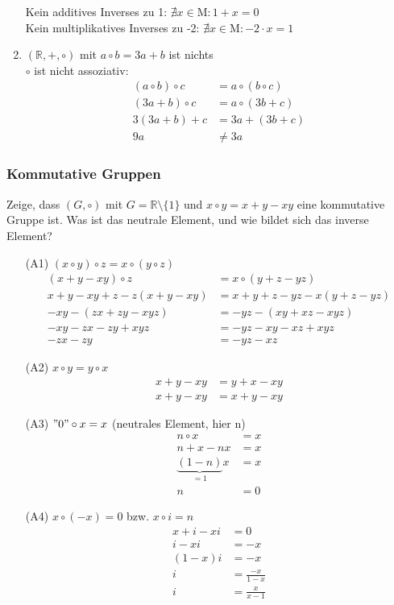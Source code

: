 \documentclass[11pt, a4paper]{article}
\begin{document}
\begin{enumerate}
		Kein additives Inverses zu 1: $\nexists x \in \mathrm{M}: 1+x=0$ \\
		Kein multiplikatives Inverses zu -2: $\nexists x \in \mathrm{M}: -2 \cdot x = 1$
	\item $\left( \mathbb{R}, +, \circ \right)$ mit $a \circ b = 3a + b$ ist nichts \\
		$\circ$ ist nicht assoziativ:
		\begin{align*}
			(a \circ b) \circ c &= a \circ (b \circ c) \\
			(3a + b) \circ c &= a \circ (3b + c) \\
			3(3a + b) + c &= 3a + (3b + c) \\
			9a &\neq 3a
		\end{align*}
\end{enumerate}

\subsubsection{Kommutative Gruppen}
Zeige, dass $(G,\circ)$ mit $G=\mathbb{R} \setminus \{1\}$ und $x \circ y = x+y-xy$ eine kommutative Gruppe ist. Was ist das neutrale Element, und wie bildet sich das inverse Element?
\begin{enumerate}
	\item[(A1)] $(x \circ y) \circ z = x \circ (y \circ z)$
		\begin{align*}
			(x+y-xy) \circ z &= x \circ (y+z-yz) \\
			x+y-xy + z - z(x+y-xy) &= x+ y+z-yz - x(y+z-yz) \tag*{$-x-y-z$} \\
			-xy - (zx+zy-xyz)&= -yz - (xy+xz-xyz) \\
			-xy - zx - zy + xyz &= -yz - xy - xz + xyz \tag*{- xyz + xy} \\
			- zx - zy &= -yz - xz \tag*{sichtbar gleich}
		\end{align*}
	\item[(A2)] $x \circ y = y \circ x$
		\begin{align*}
			x+y-xy &= y+x-xy \\
			x+y-xy &= x+y-xy
		\end{align*}
	\item[(A3)] $"0" \circ x = x$ (neutrales Element, hier n)
		\begin{align*}
			n \circ x &= x \\
			n+x-nx &= x \\
			\underbrace{(1-n)}_{=1}x &= x \\
			n &= 0
		\end{align*}
	\item[(A4)] $x \circ (-x) = 0$ bzw. $x \circ i = n$
		\begin{align*}
			x + i - xi &= 0 \\
			i - xi &= -x \\
			(1-x)i &= -x \\
			i &= \frac{-x}{1-x} \tag*{$1 \notin G$} \\
			i &= \frac{x}{x-1}
		\end{align*}
\end{enumerate}
\end{document}
